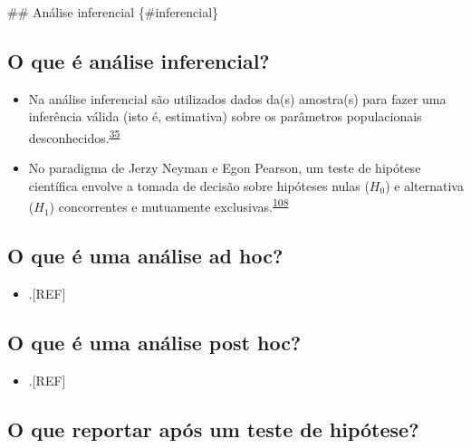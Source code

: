 \documentclass[
  a4paper,
]{book}
\providecommand{\tightlist}{%
  \setlength{\itemsep}{0pt}\setlength{\parskip}{0pt}}
\begin{document}
\#\# Análise inferencial \{\#inferencial\}

\hypertarget{o-que-uxe9-anuxe1lise-inferencial}{%
\subsection{O que é análise inferencial?}\label{o-que-uxe9-anuxe1lise-inferencial}}

\begin{itemize}
\item
  Na análise inferencial são utilizados dados da(s) amostra(s) para fazer uma inferência válida (isto é, estimativa) sobre os parâmetros populacionais desconhecidos.\textsuperscript{\protect\hyperlink{ref-vetter2017}{35}}
\item
  No paradigma de Jerzy Neyman e Egon Pearson, um teste de hipótese científica envolve a tomada de decisão sobre hipóteses nulas (\(H_{0}\)) e alternativa (\(H_{1}\)) concorrentes e mutuamente exclusivas.\textsuperscript{\protect\hyperlink{ref-Curran-Everett2009}{108}}
\end{itemize}

\hypertarget{o-que-uxe9-uma-anuxe1lise-ad-hoc}{%
\subsection{O que é uma análise ad hoc?}\label{o-que-uxe9-uma-anuxe1lise-ad-hoc}}

\begin{itemize}
\tightlist
\item
  .{[}REF{]}
\end{itemize}

\hypertarget{o-que-uxe9-uma-anuxe1lise-post-hoc}{%
\subsection{O que é uma análise post hoc?}\label{o-que-uxe9-uma-anuxe1lise-post-hoc}}

\begin{itemize}
\tightlist
\item
  .{[}REF{]}
\end{itemize}

\hypertarget{o-que-reportar-apuxf3s-um-teste-de-hipuxf3tese}{%
\subsection{O que reportar após um teste de hipótese?}\label{o-que-reportar-apuxf3s-um-teste-de-hipuxf3tese}}
\end{document}
